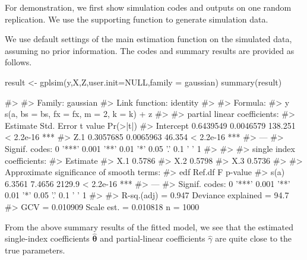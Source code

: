 For demonstration, we first show simulation codes and outputs on one random replication. We use the supporting function  to generate simulation data.
\begin{Schunk}
  \end{Schunk}
  
We use default settings of the main estimation function  on the simulated data, assuming no prior information. The codes and summary results are provided as follows.
\begin{Schunk}
  \begin{Sinput}
  result <- gplsim(y,X,Z,user.init=NULL,family = gaussian)
  summary(result)
  \end{Sinput}
  \begin{Soutput}
  #> 
  #> Family: gaussian 
  #> Link function: identity 
  #> 
  #> Formula:
  #> y ~ s(a, bs = bs, fx = fx, m = 2, k = k) + z
  #> 
  #> partial linear coefficients:
  #>            Estimate Std. Error t value  Pr(>|t|)    
  #> Intercept 0.6439549  0.0046579 138.251 < 2.2e-16 ***
  #> Z.1       0.3057685  0.0065963  46.354 < 2.2e-16 ***
  #> ---
  #> Signif. codes:  0 '***' 0.001 '**' 0.01 '*' 0.05 '.' 0.1 ' ' 1
  #> 
  #> 
  #> single index coefficients:
  #>     Estimate
  #> X.1   0.5786
  #> X.2   0.5798
  #> X.3   0.5736
  #> 
  #> Approximate significance of smooth terms:
  #>         edf Ref.df      F   p-value    
  #> s(a) 6.3561 7.4656 2129.9 < 2.2e-16 ***
  #> ---
  #> Signif. codes:  0 '***' 0.001 '**' 0.01 '*' 0.05 '.' 0.1 ' ' 1
  #> 
  #> R-sq.(adj) =  0.947   Deviance explained = 94.7%
  #> GCV = 0.010909  Scale est. = 0.010818  n = 1000
  \end{Soutput}
\end{Schunk}

From the above summary results of the fitted model, we see that the estimated single-index coefficients \(\widehat{\boldsymbol{\theta}}\) and partial-linear coefficients \(\widehat{\gamma}\) are quite close to the true parameters. 

